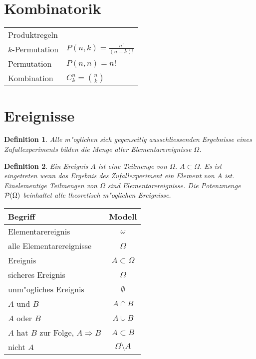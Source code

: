 \documentclass[ngerman, a4paper, 10pt, twocolumn, DIV20, headings=small]{scrartcl}
\newtheorem{definition}{Definition}
\begin{document}
\section{Kombinatorik}
\label{sec:kombinatorik}


\begin{tabular}{l l}
  Produktregeln &  \\
  $k$-Permutation &  $P(n,k) = \frac{n!}{(n-k)!}$\\
  Permutation & $P(n,n) = n!$ \\
  Kombination & $ C^n_k=\binom{n}{k} $ \\ 
\end{tabular}

\section{Ereignisse} 
\label{sec:ereignisse}

\begin{definition}
  Alle m"oglichen sich gegenseitig ausschliessenden Ergebnisse eines Zufallexperiments bilden die Menge aller Elementarereignisse $\Omega$.
\end{definition}

\begin{definition}
  Ein Ereignis $A$ ist eine Teilmenge von $\Omega$. $A \subset \Omega$. Es ist eingetreten wenn das Ergebnis des Zufallexperiment ein Element von $A$ ist. Einelementige Teilmengen von $\Omega$ sind Elementarereignisse. Die Potenzmenge ${\cal P}(\Omega)$ beinhaltet alle theoretisch m"oglichen Ereignisse.
\end{definition}

\begin{tabular}{|l|c|}
\hline
Begriff&Modell\\
\hline
Elementarereignis&$\omega$\\
alle Elementarereignisse&$\Omega$\\
Ereignis&$A\subset\Omega$\\
sicheres Ereignis&$\Omega$\\
unm"ogliches Ereignis&$\emptyset$\\
$A$ und $B$&$A\cap B$\\
$A$ oder $B$&$A\cup B$\\
$A$ hat $B$ zur Folge, $A\Rightarrow B$&$A\subset B$\\
nicht $A$&$\Omega\setminus A$\\
\hline
\end{tabular}
\end{document}
